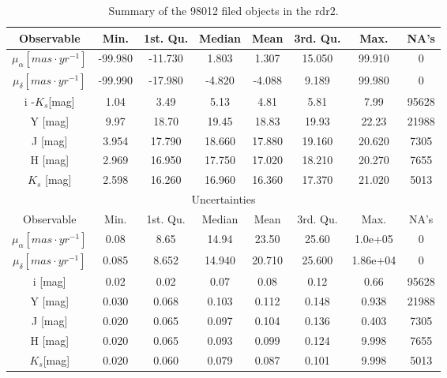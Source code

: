 \begin{table}[ht!]
\caption{Summary of the 98012 filed objects in the \gls{rdr2}.}
\begin{center}
\begin{tabular}{|c|c|c|c|c|c|c|c|}
\hline
Observable & Min. & 1st. Qu. & Median & Mean & 3rd. Qu. & Max. & NA's \\
\hline
\hline
$\mu_{\alpha} [mas\cdot yr^{-1}]$&-99.980& -11.730  & 1.803 &  1.307 & 15.050 & 99.910&0\\
$\mu_{\delta} [mas\cdot yr^{-1}]$&-99.990& -17.980  &-4.820  &-4.088   &9.189  &99.980&0\\
i -$K_s$[mag] &   1.04 &   3.49  &  5.13    &   4.81  &  5.81  &  7.99 &  95628 \\
Y [mag]          & 9.97  & 18.70      &  19.45 &  18.83 &  19.93 &  22.23  & 21988 \\
J [mag]          & 3.954 & 17.790 & 18.660 & 17.880 & 19.160 & 20.620 &   7305\\
H [mag]         & 2.969 & 16.950 & 17.750 & 17.020 & 18.210 & 20.270  &  7655\\
$K_s$ [mag] & 2.598 & 16.260 & 16.960  &16.360  &17.370 & 21.020 &   5013\\
\hline
\multicolumn{8}{c}{Uncertainties}\\
\hline
Observable & Min. & 1st. Qu. & Median &Mean& 3rd. Qu. & Max. & NA's \\
\hline
\hline
$\mu_{\alpha} [mas\cdot yr^{-1}]$&0.08  &    8.65   &  14.94   &  23.50   &  25.60 &1.0e+05&0\\ 
$\mu_{\delta} [mas\cdot yr^{-1}]$&0.085  &   8.652  &  14.940  &  20.710  &  25.600 &1.86e+04 & 0\\ 
i [mag] & 0.02        &  0.02    &    0.07 &   0.08 &  0.12   & 0.66    &    95628 \\
Y [mag] & 0.030     &   0.068&   0.103&  0.112 &   0.148&0.938  &   21988\\
J [mag] & 0.020      &  0.065  & 0.097  & 0.104 & 0.136  &0.403   & 7305\\
H [mag] & 0.020     &  0.065  & 0.093  &0.099  & 0.124  &9.998   & 7655\\
$K_s$[mag]&0.020 &  0.060 &  0.079 & 0.087  & 0.101 & 9.998  & 5013\\
\hline
\end{tabular}
\end{center}
\label{tab:rddr2_field}
\end{table}%



